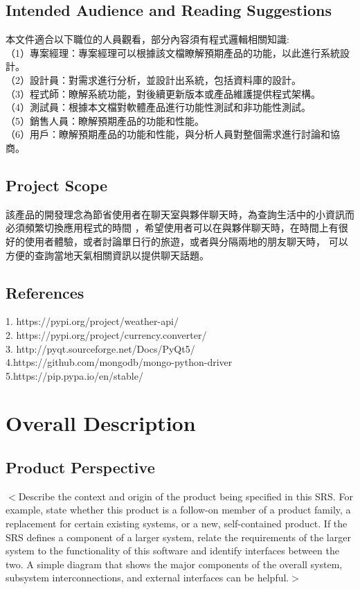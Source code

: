 \documentclass{scrreprt}
\begin{document}
\begin{CJK}{UTF8}{bkai}
\section{Intended Audience and Reading Suggestions}
本文件適合以下職位的人員觀看，部分內容須有程式邏輯相關知識: \\
（1）專案經理：專案經理可以根據該文檔瞭解預期產品的功能，以此進行系統設計。 \\
（2）設計員：對需求進行分析，並設計出系統，包括資料庫的設計。 \\
（3）程式師：瞭解系統功能，對後續更新版本或產品維護提供程式架構。 \\
（4）測試員：根據本文檔對軟體產品進行功能性測試和非功能性測試。 \\
（5）銷售人員：瞭解預期產品的功能和性能。 \\
（6）用戶：瞭解預期產品的功能和性能，與分析人員對整個需求進行討論和協商。 \\


\section{Project Scope}
該產品的開發理念為節省使用者在聊天室與夥伴聊天時，為查詢生活中的小資訊而必須頻繁切換應用程式的時間
，希望使用者可以在與夥伴聊天時，在時間上有很好的使用者體驗，或者討論單日行的旅遊，或者與分隔兩地的朋友聊天時，
可以方便的查詢當地天氣相關資訊以提供聊天話題。

\section{References}
1. https://pypi.org/project/weather-api/ \\
2. https://pypi.org/project/currency.converter/ \\
3. http://pyqt.sourceforge.net/Docs/PyQt5/ \\
4.https://github.com/mongodb/mongo-python-driver\\
5.https://pip.pypa.io/en/stable/\\




\chapter{Overall Description}

\section{Product Perspective}
$<$Describe the context and origin of the product being specified in this SRS.  
For example, state whether this product is a follow-on member of a product 
family, a replacement for certain existing systems, or a new, self-contained 
product. If the SRS defines a component of a larger system, relate the 
requirements of the larger system to the functionality of this software and 
identify interfaces between the two. A simple diagram that shows the major 
components of the overall system, subsystem interconnections, and external 
interfaces can be helpful.$>$


\end{CJK}
\end{document}

